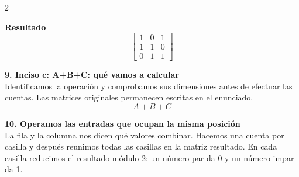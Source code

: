 \documentclass[11pt,a4paper,landscape]{article}
\begin{document}
\begin{multicols*}{2}
\begin{minipage}{\linewidth}
\par\smallskip \textbf{Resultado}\[\begin{bmatrix}1 & 0 & 1\\1 & 1 & 0\\0 & 1 & 1\end{bmatrix}\]
\end{minipage}\par\medskip
\noindent\begin{minipage}{\linewidth}\textbf{9. Inciso c: A+B+C: qué vamos a calcular}\\[2pt]Identificamos la operación y comprobamos sus dimensiones antes de efectuar las cuentas. Las matrices originales permanecen escritas en el enunciado.
\[A+B+C\]
\end{minipage}\par\medskip
\noindent\begin{minipage}{\linewidth}\textbf{10. Operamos las entradas que ocupan la misma posición}\\[2pt]La fila y la columna nos dicen qué valores combinar. Hacemos una cuenta por casilla y después reunimos todas las casillas en la matriz resultado. En cada casilla reducimos el resultado módulo 2: un número par da 0 y un número impar da 1.
\par{}\par\smallskip

\end{minipage}
\end{multicols*}
\end{document}

